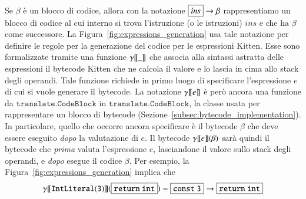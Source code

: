 Se $\beta$ \`e un blocco di codice, allora con la notazione
$\fbox{$\mathit{ins}$}\to\beta$
rappresentiamo un blocco di codice
al cui interno si trova l'istruzione (o le istruzioni) $\mathit{ins}$
e che ha $\beta$ come successore.
La Figura~\ref{fig:expressions_generation} usa tale notazione per
definire le regole per la
generazione del codice per le espressioni Kitten. Esse sono formalizzate
tramite una funzione ${\gamma[\![{\_}]\!]}$ che associa alla sintassi astratta
delle espressioni il bytecode Kitten che ne calcola il valore e lo lascia
in cima allo stack degli operandi.
Tale funzione richiede in primo luogo di specificare l'espressione $e$
di cui si vuole generare il bytecode. La notazione ${\gamma[\![{e}]\!]}$ \`e
per\`o ancora una funzione da $\mathtt{translate.CodeBlock}$ in
$\mathtt{translate.CodeBlock}$, \cioe la classe usata per
rappresentare un blocco di bytecode
(Sezione~\ref{subsec:bytecode_implementation}). In particolare, quello che
occorre ancora specificare \`e il bytecode $\beta$
che deve essere eseguito \emph{dopo} la valutazione di $e$.
Il bytecode ${\gamma[\![{e}]\!]}(\beta)$ sar\`a quindi il bytecode che \emph{prima}
valuta l'espressione $e$, lasciandone il valore sullo stack degli operandi,
e \emph{dopo} esegue il codice $\beta$. Per esempio, la
Figura~\ref{fig:expressions_generation} implica che
\[
  \gen{\mathtt{IntLiteral(3)}}(\fbox{$\mathtt{return\ int}$})
    =\fbox{$\mathtt{const\ 3}$}\to\fbox{$\mathtt{return\ int}$}
\]

